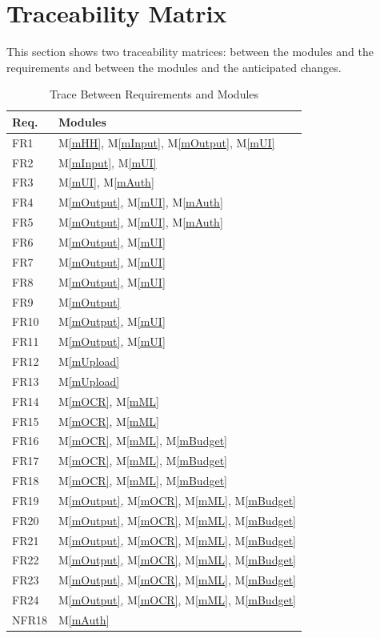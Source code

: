 \documentclass[12pt, titlepage]{article}
\newcommand{\mref}[1]{M\ref{#1}}
\begin{document}
\section{Traceability Matrix} \label{SecTM}

This section shows two traceability matrices: between the modules and the
requirements and between the modules and the anticipated changes.

\begin{table}[H]
\centering
\begin{tabular}{p{} p{}}
\toprule
\textbf{Req.} & \textbf{Modules}\\
\midrule
FR1 & \mref{mHH}, \mref{mInput}, \mref{mOutput}, \mref{mUI}\\
FR2 & \mref{mInput}, \mref{mUI}\\
FR3 & \mref{mUI}, \mref{mAuth}\\
FR4 & \mref{mOutput}, \mref{mUI}, \mref{mAuth}\\
FR5 & \mref{mOutput}, \mref{mUI}, \mref{mAuth}\\
FR6 & \mref{mOutput}, \mref{mUI}\\
FR7 & \mref{mOutput}, \mref{mUI}\\
FR8 & \mref{mOutput}, \mref{mUI}\\
FR9 & \mref{mOutput}\\
FR10 & \mref{mOutput}, \mref{mUI}\\
FR11 & \mref{mOutput}, \mref{mUI}\\
FR12 & \mref{mUpload}\\
FR13 & \mref{mUpload}\\
FR14 & \mref{mOCR}, \mref{mML}\\
FR15 & \mref{mOCR}, \mref{mML}\\
FR16 & \mref{mOCR}, \mref{mML}, \mref{mBudget}\\
FR17 & \mref{mOCR}, \mref{mML}, \mref{mBudget}\\
FR18 & \mref{mOCR}, \mref{mML}, \mref{mBudget}\\
FR19 & \mref{mOutput}, \mref{mOCR}, \mref{mML}, \mref{mBudget}\\
FR20 & \mref{mOutput}, \mref{mOCR}, \mref{mML}, \mref{mBudget}\\
FR21 & \mref{mOutput}, \mref{mOCR}, \mref{mML}, \mref{mBudget}\\
FR22 & \mref{mOutput}, \mref{mOCR}, \mref{mML}, \mref{mBudget}\\
FR23 & \mref{mOutput}, \mref{mOCR}, \mref{mML}, \mref{mBudget}\\
FR24 & \mref{mOutput}, \mref{mOCR}, \mref{mML}, \mref{mBudget}\\
NFR18 & \mref{mAuth}\\

\bottomrule
\end{tabular}
\caption{Trace Between Requirements and Modules}
\label{TblRT}
\end{table}
\end{document}
